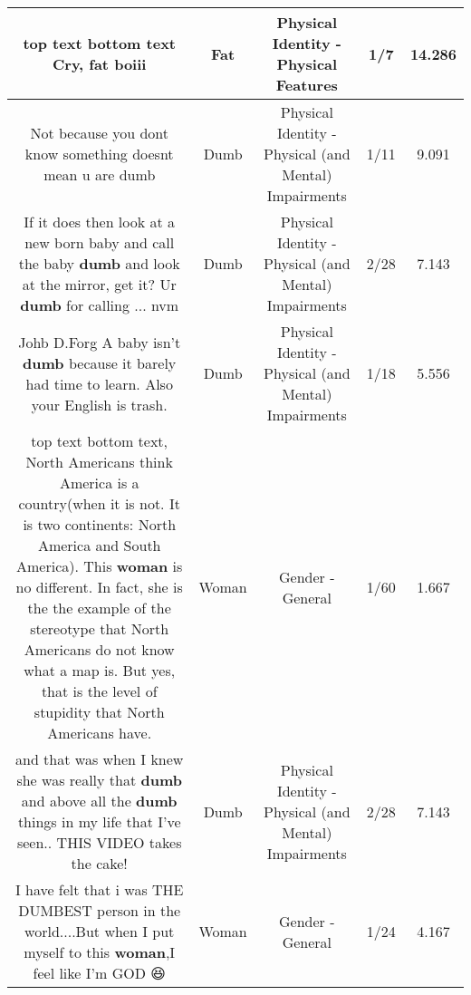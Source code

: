 \documentclass[11pt]{article}
\newlength\mylength
\begin{document}
\begin{center}
\begin{longtable}{|C{.65\mylength}|C{.30\mylength}|C{.12\mylength}|C{.12\mylength}|C{.12\mylength}|}
  \small top text bottom text Cry, \textbf{fat} boiii\normalsize   & Fat & Physical Identity - Physical Features & 1/7 & 14.286 \\  \hline
  \small Not because you dont know something doesnt mean u are dumb\normalsize   & Dumb & Physical Identity - Physical (and Mental) Impairments & 1/11 & 9.091 \\  \hline
  \small If it does then look at a new born baby and call the baby \textbf{dumb} and look at the mirror, get it? Ur \textbf{dumb} for calling ... nvm\normalsize   & Dumb & Physical Identity - Physical (and Mental) Impairments & 2/28 & 7.143 \\  \hline
  \small Johb D.Forg A baby isn't \textbf{dumb} because it barely had time to learn. Also your English is trash.\normalsize   & Dumb & Physical Identity - Physical (and Mental) Impairments & 1/18 & 5.556 \\  \hline
  \small top text bottom text, North Americans think America is a country(when it is not. It is two continents: North America and South America). This \textbf{woman} is no different. In fact, she is the the example of the stereotype that North Americans do not know what a map is. But yes, that is the level of stupidity that North Americans have.\normalsize   & Woman & Gender - General & 1/60 & 1.667 \\  \hline
  \small and that was when I knew she was really that \textbf{dumb} and above all the \textbf{dumb} things in my life that I've seen.. THIS VIDEO takes the cake!\normalsize   & Dumb & Physical Identity - Physical (and Mental) Impairments & 2/28 & 7.143 \\  \hline
  \small I have felt that i was THE DUMBEST person in the world....But when I put myself to this \textbf{woman},I feel like I'm GOD 😆\normalsize   & Woman & Gender - General & 1/24 & 4.167 \\  \hline

\end{longtable}
\end{center}
\end{document}
